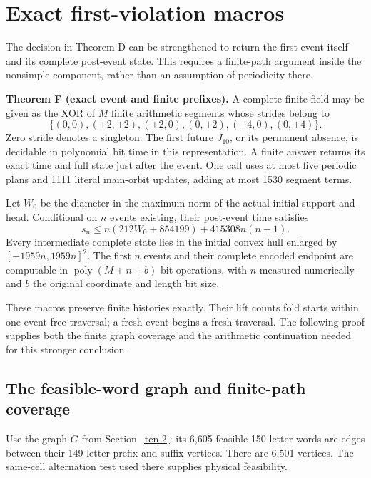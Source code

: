 \section{Exact first-violation
macros}\label{exact-first-violation-macros}

The decision in Theorem D can be strengthened to return the first event
itself and its complete post-event state. This requires a finite-path
argument inside the nonsimple component, rather than an assumption of
periodicity there.

\textbf{Theorem F (exact event and finite prefixes).} A complete finite
field may be given as the XOR of \(M\) finite arithmetic segments whose
strides belong to
\[\{(0,0),(\pm2,\pm2),(\pm2,0),(0,\pm2),(\pm4,0),(0,\pm4)\}.\] Zero
stride denotes a singleton. The first future \(J_{10}\), or its
permanent absence, is decidable in polynomial bit time in this
representation. A finite answer returns its exact time and full state
just after the event. One call uses at most five periodic plans and 1111
literal main-orbit updates, adding at most 1530 segment terms.

Let \(W_0\) be the diameter in the maximum norm of the actual initial
support and head. Conditional on \(n\) events existing, their post-event
time satisfies \begin{equation}\label{eq:macro1}s_n\le n(212W_0+854199)+415308n(n-1). \end{equation}
Every intermediate complete state lies in the initial convex hull
enlarged by \([-1959n,1959n]^2\). The first \(n\) events and their
complete encoded endpoint are computable in
\(\operatorname{poly}(M+n+b)\) bit operations, with \(n\) measured
numerically and \(b\) the original coordinate and length bit size.

These macros preserve finite histories exactly. Their lift counts fold
starts within one event-free traversal; a fresh event begins a fresh
traversal. The following proof supplies both the finite graph coverage
and the arithmetic continuation needed for this stronger conclusion.

\subsection{The feasible-word graph and finite-path coverage}\label{macro-3}

Use the graph $G$ from Section~\ref{ten-2}: its 6,605 feasible
150-letter words are edges between their 149-letter prefix and suffix
vertices. There are 6,501 vertices. The same-cell alternation test used
there supplies physical feasibility.

